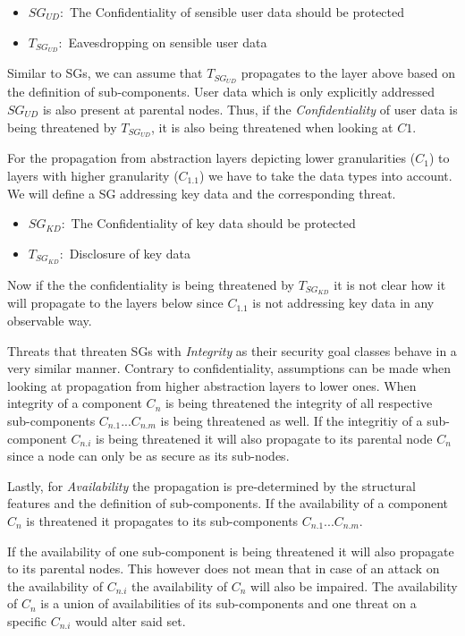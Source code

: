 \begin{itemize}
\item[]\textbf{$SG_{UD}:$} The Confidentiality of sensible user data should be protected
\item[]\textbf{$T_{SG_{UD}}:$} Eavesdropping on sensible user data
\end{itemize}

Similar to SGs, we can assume that $T_{SG_{UD}}$ propagates to the layer above based on the definition of sub-components. User data which is only explicitly addressed $SG_{UD}$ is also present at parental nodes. Thus, if the \textit{Confidentiality} of user data is being threatened by $T_{SG_{UD}}$, it is also being threatened when looking at $C1$.

For the propagation from abstraction layers depicting lower granularities ($C_1$) to layers with higher granularity ($C_{1.1}$) we have to take the data types into account. We will define a SG addressing key data and the corresponding threat.

\begin{itemize}
\item[]\textbf{$SG_{KD}:$} The Confidentiality of key data should be protected
\item[]\textbf{$T_{SG_{KD}}:$} Disclosure of key data
\end{itemize}

Now if the the confidentiality is being threatened by $T_{SG_{KD}}$ it is not clear how it will propagate to the layers below since $C_{1.1}$ is not addressing key data in any observable way. 

Threats that threaten SGs with \textit{Integrity} as their security goal classes behave in a very similar manner. Contrary to confidentiality, assumptions can be made when looking at propagation from higher abstraction layers to lower ones. When integrity of a component $C_n$ is being threatened the integrity of all respective sub-components $C_{n.1} ... C_{n.m}$ is being threatened as well. If the integritiy of a sub-component $C_{n.i}$ is being threatened it will also propagate to its parental node $C_n$ since a node can only be as secure as its sub-nodes.

Lastly, for \textit{Availability} the propagation is pre-determined by the structural features and the definition of sub-components. If the availability of a component $C_n$ is threatened it propagates to its sub-components $C_{n.1} ... C_{n.m}$. 

If the availability of one sub-component is being threatened it will also propagate to its parental nodes. This however does not mean that in case of an attack on the availability of $C_{n.i}$ the availability of $C_n$ will also be impaired. The availability of $C_n$ is a union of availabilities of its sub-components and one threat on a specific $C_{n.i}$ would alter said set.


